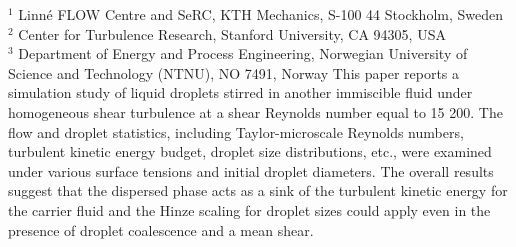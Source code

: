 %
%
%
%
%
%
%
\paperaffiliation
{%
  $^1$ Linn\'e FLOW Centre and SeRC, KTH Mechanics, S-100 44 Stockholm, Sweden\\%
  $^2$ Center for Turbulence Research, Stanford University, CA 94305, USA\\%
  $^3$ Department of Energy and Process Engineering, Norwegian University of Science and Technology (NTNU), NO 7491, Norway%
}%
%
%
%
%
%
\papernumber{}%
%
%
%
%
%
\papersummary%
{%
   This paper reports a simulation study of liquid droplets stirred in another immiscible  fluid under homogeneous shear turbulence at  a  shear  Reynolds  number  equal to  15 200. The flow and droplet statistics, including Taylor-microscale  Reynolds  numbers, turbulent  kinetic  energy budget, droplet size distributions, etc., were examined under various surface tensions and initial droplet diameters. The overall results suggest that the dispersed  phase acts  as  a  sink  of  the turbulent  kinetic  energy  for  the  carrier  fluid and the Hinze scaling for droplet sizes could apply even in the presence of droplet coalescence and a mean shear.
}%
%
\graphicspath{{paper5/}}%
%
%
%
